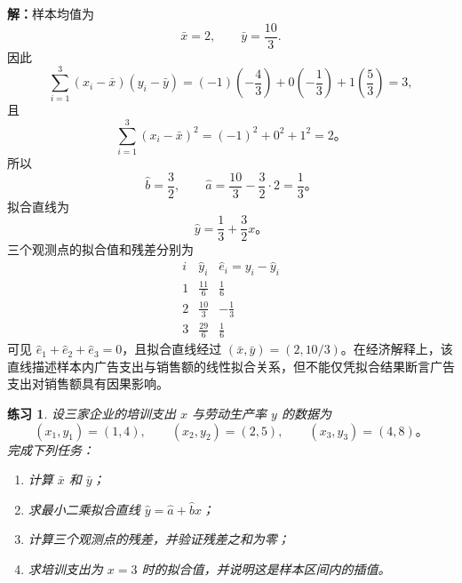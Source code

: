 \documentclass[UTF8,fontset=fandol,11pt]{ctexart}
\newtheorem{exercise}[definition]{练习}
\begin{document}
\par\noindent\textbf{解：}样本均值为
\[
\bar x=2,
\qquad
\bar y=\frac{10}{3}.
\]
因此
\[
\sum_{i=1}^{3}(x_i-\bar x)(y_i-\bar y)
=(-1)\left(-\frac43\right)+0\left(-\frac13\right)+1\left(\frac53\right)=3,
\]
且
\[
\sum_{i=1}^{3}(x_i-\bar x)^2=(-1)^2+0^2+1^2=2\text{。}
\]
所以
\[
\hat b=\frac{3}{2},
\qquad
\hat a=\frac{10}{3}-\frac32\cdot2=\frac13\text{。}
\]
拟合直线为
\[
\hat y=\frac13+\frac32x\text{。}
\]
三个观测点的拟合值和残差分别为
\[
\begin{array}{c|c|c}
 i&\hat y_i&\hat e_i=y_i-\hat y_i\\ \hline
 1&\frac{11}{6}&\frac16\\
 2&\frac{10}{3}&-\frac13\\
 3&\frac{29}{6}&\frac16
\end{array}
\]
可见 $\hat e_1+\hat e_2+\hat e_3=0$，且拟合直线经过 $(\bar x,\bar y)=(2,10/3)$。在经济解释上，该直线描述样本内广告支出与销售额的线性拟合关系，但不能仅凭拟合结果断言广告支出对销售额具有因果影响。\par
\begin{exercise}
\label{mathagent:exercise:41706b9e371cbf8283a4f1192e660b4426644ffb8f650af52f47cef5491b1ca0}
设三家企业的培训支出 $x$ 与劳动生产率 $y$ 的数据为
\[
(x_1,y_1)=(1,4),\qquad (x_2,y_2)=(2,5),\qquad (x_3,y_3)=(4,8)\text{。}
\]
完成下列任务：
\begin{enumerate}
\item 计算 $\bar x$ 和 $\bar y$；
\item 求最小二乘拟合直线 $\hat y=\hat a+\hat b x$；
\item 计算三个观测点的残差，并验证残差之和为零；
\item 求培训支出为 $x=3$ 时的拟合值，并说明这是样本区间内的插值。
\end{enumerate}
\end{exercise}
\end{document}
